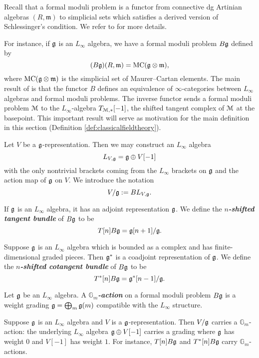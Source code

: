 \documentclass[10pt, oneside]{article}
\newcommand{\Gm}{\mathbb{G}_m}
\newcommand{\defterm}[1]{\textbf{\emph{#1}}}
\begin{document}
Recall that a formal moduli problem is a functor from connective dg Artinian algebras $(R, \mathfrak{m})$ to simplicial sets which satisfies a derived version of Schlessinger's condition. We refer to \cite{DAGX,PridhamFMP,Toen} for more details.

For instance, if $\mathfrak g$ is an $L_\infty$ algebra, we have a formal moduli problem $B\mathfrak g$ defined by
\[(B\mathfrak g)(R, \mathfrak{m})=\mathrm{MC}(\mathfrak g\otimes \mathfrak{m}),\]
where $\mathrm{MC}(\mathfrak g\otimes \mathfrak{m})$ is the simplicial set of Maurer--Cartan elements. The main result of \cite{DAGX,PridhamFMP} is that the functor $B$ defines an equivalence of $\infty$-categories between $L_\infty$ algebras and formal moduli problems. The inverse functor sends a formal moduli problem $\mathcal M$ to the $L_\infty$-algebra $T_{\mathcal M, \ast}[-1]$, the shifted tangent complex of $\mathcal M$ at the basepoint. This important result will serve as motivation for the main definition in this section (Definition \ref{def:classicalfieldtheory}).

Let $V$ be a $\mathfrak g$-representation. Then we may construct an $L_\infty$ algebra
\[L_{V, \mathfrak g}=\mathfrak g\oplus V[-1]\]
with the only nontrivial brackets coming from the $L_\infty$ brackets on $\mathfrak g$ and the action map of $\mathfrak g$ on $V$. We introduce the notation
\[V/\mathfrak g:= B L_{V, \mathfrak g}.\]

\begin{example}
If $\mathfrak g$ is an $L_\infty$ algebra, it has an adjoint representation $\mathfrak g$. We define the \defterm{$n$-shifted tangent bundle} of $B\mathfrak g$ to be
\[T[n] B\mathfrak g = \mathfrak g[n+1] / \mathfrak g.\]
\label{ex:tangentBg}
\end{example}

\begin{example}
Suppose $\mathfrak g$ is an $L_\infty$ algebra which is bounded as a complex and has finite-dimensional graded pieces. Then $\mathfrak g^*$ is a coadjoint representation of $\mathfrak g$. We define the \defterm{$n$-shifted cotangent bundle} of $B\mathfrak g$ to be
\[T^*[n] B\mathfrak g = \mathfrak g^*[n-1] / \mathfrak g.\]
\label{ex:cotangentBg}
\end{example}

\begin{definition}
Let $\mathfrak g$ be an $L_\infty$ algebra. A \defterm{$\Gm$-action} on a formal moduli problem $B\mathfrak g$ is a weight grading $\mathfrak g = \bigoplus_m \mathfrak g(m)$ compatible with the $L_\infty$ structure.
\end{definition}

\begin{example}
Suppose $\mathfrak g$ is an $L_\infty$ algebra and $V$ is a $\mathfrak g$-representation. Then $V/\mathfrak g$ carries a $\Gm$-action: the underlying $L_\infty$ algebra $\mathfrak g\oplus V[-1]$ carries a grading where $\mathfrak g$ has weight $0$ and $V[-1]$ has weight $1$. For instance, $T[n] B\mathfrak g$ and $T^*[n] B\mathfrak g$ carry $\Gm$-actions.
\end{example}
\end{document}
